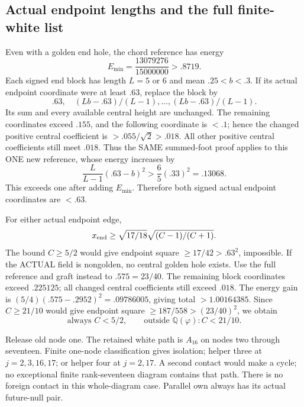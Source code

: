 \documentclass[11pt]{article}
\begin{document}
\subsection{Actual endpoint lengths and the full finite-white list}
\label{app:arithA17endpointlist}

Even with a golden end hole, the chord reference has energy
\[
 E_{\min}={\frac{13079276}{15000000}}>.8719 .
\]
Each signed end block has length \(L=5\) or \(6\) and mean
\(.25<b<.3\).
If its actual endpoint coordinate were at least \(.63\), replace
the block by
\[
 .63,\quad (Lb-.63)/(L-1),\ldots,(Lb-.63)/(L-1).
\]
Its sum and every available central height are unchanged.
The remaining coordinates exceed \(.155\), and the following
coordinate is \(<.1\); hence the changed positive central
coefficient is \(>.055/\sqrt2>.018\).
All other positive central coefficients still meet \(.018\).
Thus the SAME summed-foot proof applies to this ONE new
reference, whose energy increases by
\[
 {\frac{L}{L-1}}(.63-b)^2>{\frac{6}{5}}(.33)^2=.13068.
\]
This exceeds one after adding \(E_{\min}\).
Therefore both signed actual endpoint coordinates are \(<.63\).

For either actual endpoint edge,
\[
 x_{\rm end}\ge\sqrt{17/18}
                        \sqrt{(C-1)/(C+1)} .
\]
The bound \(C\ge5/2\) would give endpoint square
\(\ge17/42>.63^2\), impossible.
If the ACTUAL field is nongolden, no central golden hole exists.
Use the full reference and graft instead to \(.575=23/40\).
The remaining block coordinates exceed \(.225125\);
all changed central coefficients still exceed \(.018\).
The energy gain is
\((5/4)(.575-.2952)^2=.09786005\), giving total
\(>1.00164385\).
Since \(C\ge21/10\) would give endpoint square
\(\ge187/558>(23/40)^2\), we obtain
\[
 \text{always }C<5/2,\qquad
 \text{outside }\mathbb Q(\varphi): C<21/10 .
\tag{A17C}\label{eq:arithA17C}
\]

Release old node one.
The retained white path is \(A_{16}\) on nodes two through
seventeen.  Finite one-node classification gives isolation;
helper three at \(j=2,3,16,17\); or helper four at \(j=2,17\).
A second contact would make a cycle; no exceptional finite
rank-seventeen diagram contains that path.
There is no foreign contact in this whole-diagram case.
Parallel own always has its actual future-null pair.
\end{document}

